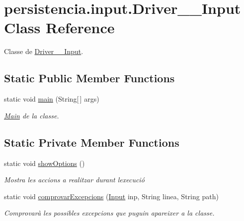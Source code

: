 \hypertarget{classpersistencia_1_1input_1_1Driver____Input}{}\section{persistencia.\+input.\+Driver\+\_\+\+\_\+\+Input Class Reference}
\label{classpersistencia_1_1input_1_1Driver____Input}


Classe de \hyperlink{classpersistencia_1_1input_1_1Driver____Input}{Driver\+\_\+\+\_\+\+Input}.  


\subsection*{Static Public Member Functions}
\begin{DoxyCompactItemize}
\item 
static void \hyperlink{classpersistencia_1_1input_1_1Driver____Input_a6a020d74862cb62628ab644253271179}{main} (String\mbox{[}$\,$\mbox{]} args)
\begin{DoxyCompactList}\small\item\em \hyperlink{classMain}{Main} de la classe. \end{DoxyCompactList}\end{DoxyCompactItemize}
\subsection*{Static Private Member Functions}
\begin{DoxyCompactItemize}
\item 
\mbox{\label{classpersistencia_1_1input_1_1Driver____Input_a4f8a0f13847071d675771817ee212f2c}} 
static void \hyperlink{classpersistencia_1_1input_1_1Driver____Input_a4f8a0f13847071d675771817ee212f2c}{show\+Options} ()
\begin{DoxyCompactList}\small\item\em Mostra les accions a realitzar durant l\textquotesingle{}execució \end{DoxyCompactList}\item 
static void \hyperlink{classpersistencia_1_1input_1_1Driver____Input_a46e7f159cd6fda2de6eaac3cec973963}{comprovar\+Excepcions} (\hyperlink{classpersistencia_1_1input_1_1Input}{Input} inp, String linea, String path)
\begin{DoxyCompactList}\small\item\em Comprovarà les possibles excepcions que puguin apareixer a la classe. \end{DoxyCompactList}\end{DoxyCompactItemize}


